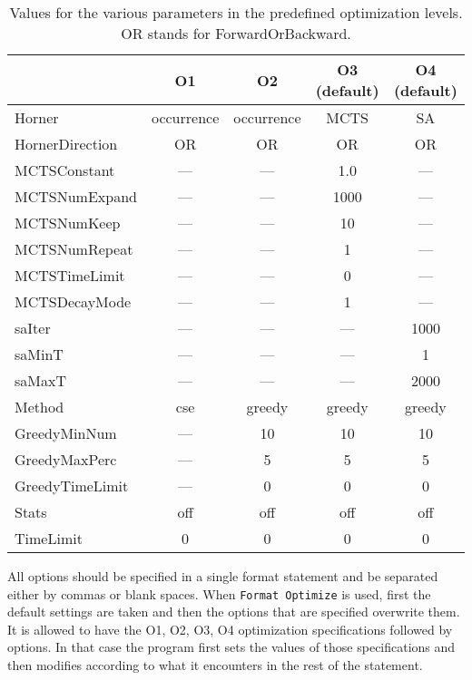 { \small
\begin{table}[!ht]
\centering
\begin{tabular}{|l|c|c|c|c|}
\hline
                &     O1      &    O2       & O3 (default) & O4 (default) \\
 \hline
Horner          &  occurrence &  occurrence &   MCTS  &      SA     \\
HornerDirection &     OR      &      OR     &    OR   &      OR     \\
MCTSConstant    &    ---      &     ---     &   1.0   &     ---     \\
MCTSNumExpand   &    ---      &     ---     &  1000   &     ---     \\
MCTSNumKeep     &    ---      &     ---     &   10    &     ---     \\
MCTSNumRepeat   &    ---      &     ---     &    1    &     ---     \\
MCTSTimeLimit   &    ---      &     ---     &    0    &     ---     \\
MCTSDecayMode   &    ---      &     ---     &    1    &     ---     \\
saIter          &    ---      &     ---     &   ---   &     1000    \\
saMinT          &    ---      &     ---     &   ---   &      1      \\
saMaxT          &    ---      &     ---     &   ---   &     2000    \\
Method          &    cse      &    greedy   &  greedy &    greedy   \\
GreedyMinNum    &    ---      &     10      &   10    &     10      \\
GreedyMaxPerc   &    ---      &      5      &    5    &      5      \\
GreedyTimeLimit &    ---      &      0      &    0    &      0      \\
Stats           &    off      &     off     &   off   &     off     \\ 
TimeLimit       &     0       &      0      &    0    &      0      \\
\hline
\end{tabular}
\caption{Values for the various parameters in the predefined
  optimization levels. OR stands for ForwardOrBackward.}
\label{tbl:defaults}
\end{table}
} 

All options should be specified in a single format statement and be
separated either by commas or blank spaces. When
\verb|Format Optimize| is used, first the default settings are taken
and then the options that are specified overwrite them. It is allowed
to have the O1, O2, O3, O4 optimization specifications followed by
options. In that case the program first sets the values of those
specifications and then modifies according to what it encounters in
the rest of the statement.

